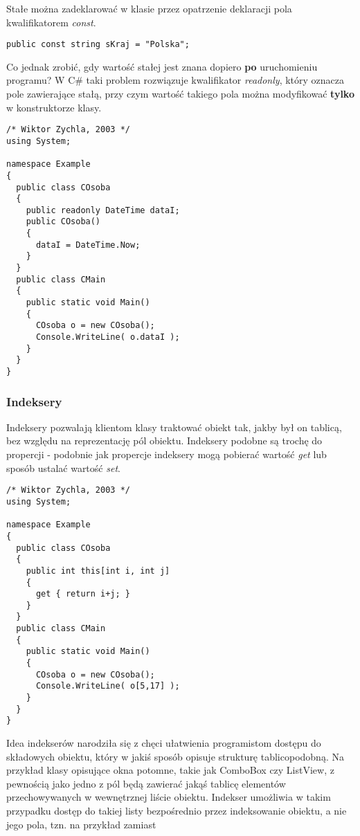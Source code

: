 Stałe można zadeklarować w klasie przez opatrzenie deklaracji pola kwalifikatorem {\em const}.

\begin{scriptsize}
\begin{verbatim}
public const string sKraj = "Polska";
\end{verbatim}
\end{scriptsize}

Co jednak zrobić, gdy wartość stałej jest znana dopiero {\bf po} uruchomieniu programu? W C\# taki problem
rozwiązuje kwalifikator {\em readonly}, który oznacza pole zawierające stałą, przy czym wartość takiego
pola można modyfikować {\bf tylko} w konstruktorze klasy.

\begin{scriptsize}
\begin{verbatim}
/* Wiktor Zychla, 2003 */
using System;

namespace Example
{
  public class COsoba
  {
    public readonly DateTime dataI;
    public COsoba()
    {
      dataI = DateTime.Now;
    }
  }
  public class CMain
  {    
    public static void Main()
    {
      COsoba o = new COsoba();
      Console.WriteLine( o.dataI );
    }
  }
}
\end{verbatim}
\end{scriptsize}

\subsubsection{Indeksery}

Indeksery pozwalają klientom klasy traktować obiekt tak, jakby był on tablicą, bez względu na 
reprezentację pól obiektu. Indeksery podobne są trochę do propercji - podobnie jak propercje indeksery
mogą pobierać wartość {\em get} lub sposób ustalać wartość {\em set}.

\begin{scriptsize}
\begin{verbatim}
/* Wiktor Zychla, 2003 */
using System;

namespace Example
{
  public class COsoba
  {
    public int this[int i, int j]
    {
      get { return i+j; }
    }
  }
  public class CMain
  {    
    public static void Main()
    {
      COsoba o = new COsoba();
      Console.WriteLine( o[5,17] );
    }
  }
}
\end{verbatim}
\end{scriptsize}

Idea indekserów narodziła się z chęci ułatwienia programistom dostępu do składowych obiektu, który
w jakiś sposób opisuje strukturę tablicopodobną. Na przykład klasy opisujące okna potomne, takie jak
ComboBox czy ListView, z pewnością jako jedno z pól będą zawierać jakąś tablicę elementów przechowywanych
w wewnętrznej liście obiektu. Indekser umożliwia w takim przypadku dostęp do takiej listy bezpośrednio
przez indeksowanie obiektu, a nie jego pola, tzn. na przykład zamiast

